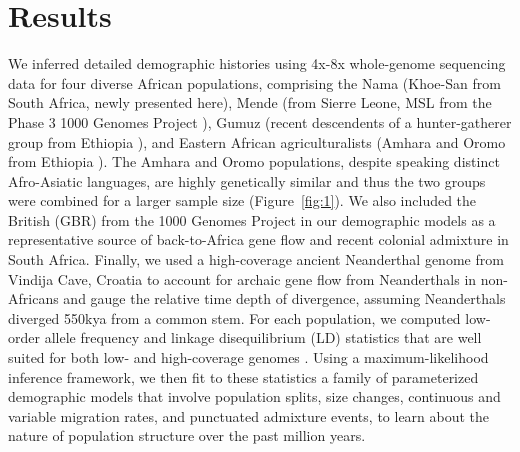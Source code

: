 \documentclass{article}
\begin{document}
\section*{Results}

We inferred detailed demographic histories using 4x-8x whole-genome sequencing
data for four diverse African populations, comprising the Nama (Khoe-San from
South Africa, newly presented here), Mende (from Sierre Leone, MSL from the
Phase 3 1000 Genomes Project \citep{1000_Genomes_Project_Consortium2015-zq}),
Gumuz (recent descendents of a hunter-gatherer group from Ethiopia
\citep{Gurdasani2015-qy,Gopalan2019-wd}), and Eastern African agriculturalists
(Amhara and Oromo from Ethiopia \citep{Gurdasani2015-qy}). The Amhara and Oromo
populations, despite speaking distinct Afro-Asiatic languages, are highly
genetically similar \citep{Pagani2015-pz,Gopalan2019-wd} and thus the two
groups were combined for a larger sample size (Figure~\ref{fig:1}). We also
included the British (GBR) from the 1000 Genomes Project in our demographic
models as a representative source of back-to-Africa gene flow and recent
colonial admixture in South Africa. Finally, we used a high-coverage ancient
Neanderthal genome from Vindija Cave, Croatia \citep{Prufer2017-kk} to account
for archaic gene flow from Neanderthals in non-Africans and gauge the relative
time depth of divergence, assuming Neanderthals diverged 550kya from a common
stem. For each population, we computed low-order allele frequency and linkage
disequilibrium (LD) statistics that are well suited for both low- and
high-coverage genomes \citep{Ragsdale2019-nt,Ragsdale2020-nz}. Using a
maximum-likelihood inference framework, we then fit to these statistics a
family of parameterized demographic models that involve population splits, size
changes, continuous and variable migration rates, and punctuated admixture
events, to learn about the nature of population structure over the past million
years.
\end{document}

